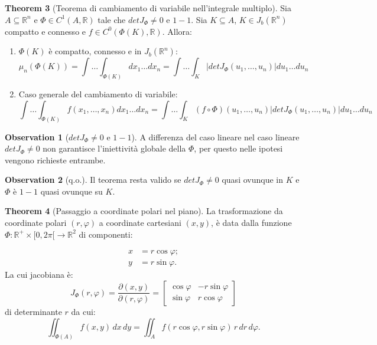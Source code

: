\documentclass[leqno]{article}
\theoremstyle{definition}
\numberwithin{equation}{section}
\newtheorem{theorem}{Theorem}[section]
\newtheorem{observation}[theorem]{Observation}
\theoremstyle{remark}
\begin{document}
	\begin{theorem}[Teorema di cambiamento di variabile nell'integrale multiplo]
		Sia $A\subseteq \mathbb{R}^n$ e $\Phi \in C^1(A,\mathbb{R})$ tale che $detJ_\Phi \neq 0$ e $1-1$. Sia $K\subseteq A$, $K\in J_b(\mathbb{R}^n)$ compatto e connesso e $f\in C^0(\Phi(K),\mathbb{R})$. Allora:
		\begin{enumerate}
			\item $\Phi(K)$ è compatto, connesso e in $J_b(\mathbb{R}^n)$:
			\begin{equation}
				\mu_n(\Phi(K))=\int \dots \int_{\Phi(K)}dx_1 \dots dx_n=\int \dots \int_K\left| detJ_\Phi (u_1,\dots ,u_n)\right| du_1\dots du_n
			\end{equation}
			\item Caso generale del cambiamento di variabile:
			\begin{equation}
				\int \dots \int_{\Phi(K)}f(x_1,\dots ,x_n)dx_1\dots dx_n=\int \dots \int_K(f \circ \Phi)(u_1, \dots, u_n)\left| detJ_\Phi (u_1,\dots ,u_n)\right| du_1\dots du_n
			\end{equation}
		\end{enumerate}
		\begin{observation}[$detJ_\Phi \neq 0$ e $1-1$]
			A differenza del caso lineare nel caso lineare $detJ_\Phi \neq 0$ non garantisce l'iniettività globale della $\Phi$, per questo nelle ipotesi vengono richieste entrambe.
		\end{observation}
		\begin{observation}[q.o.]
			Il teorema resta valido se $detJ_\Phi \neq 0$ quasi ovunque in $K$ e $\Phi$ è $1-1$ quasi ovunque su $K$.    
		\end{observation}
	\end{theorem}
	\begin{theorem}[Passaggio a coordinate polari nel piano]
		
		La trasformazione da coordinate polari $(r,\varphi)$ a coordinate cartesiani $(x,y)$, è data dalla funzione $\Phi : \mathbb{R}^+ \times [0,2\pi[ \to \mathbb{R}^2$ di componenti: 
		
		\begin{align*} 
			x&=r\cos \varphi ;\\y&=r\sin \varphi .
		\end{align*}
		La cui jacobiana è:
		\begin{equation}
			J _{\Phi} (r,\varphi )=\dfrac{\partial(x,y)}{\partial(r,\varphi)}={\begin{bmatrix}\cos \varphi &-r\sin \varphi \\\sin \varphi &r\cos \varphi \end{bmatrix}}
		\end{equation}
		di determinante $r$ da cui:
		\begin{equation}
			\iint _{\Phi(A)}f(x,y)\,dx\,dy=\iint _{A}f(r\cos \varphi ,r\sin \varphi )\,r\,dr\,d\varphi .
		\end{equation}
	\end{theorem}
\end{document}
